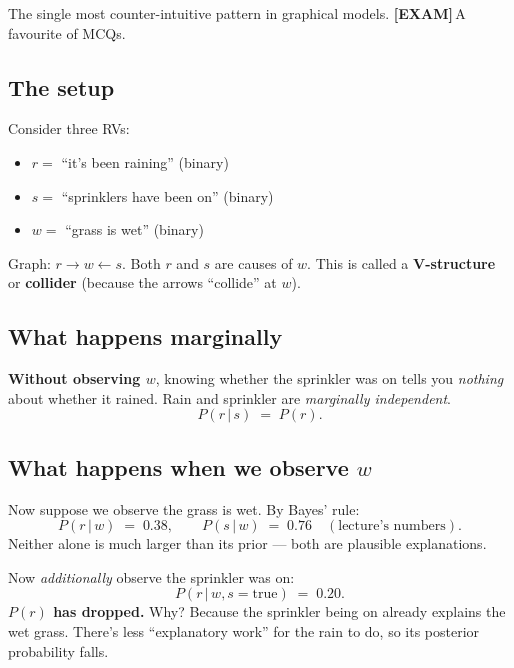 \documentclass[11pt, a4paper]{article}
\newcommand{\examflag}{\textcolor{tipBd}{\textbf{[EXAM]}}\,}
\begin{document}
The single most counter-intuitive pattern in graphical models. \examflag{}A favourite of MCQs.

\subsection{The setup}

Consider three RVs:
\begin{itemize}
  \item $r =$ ``it's been raining'' (binary)
  \item $s =$ ``sprinklers have been on'' (binary)
  \item $w =$ ``grass is wet'' (binary)
\end{itemize}

Graph: $r \to w \leftarrow s$. Both $r$ and $s$ are causes of $w$. This is called a \textbf{V-structure} or \textbf{collider} (because the arrows ``collide'' at $w$).

\subsection{What happens marginally}

\textbf{Without observing $w$}, knowing whether the sprinkler was on tells you \emph{nothing} about whether it rained. Rain and sprinkler are \emph{marginally independent}.
\[
P(r \,|\, s) \;=\; P(r).
\]

\subsection{What happens when we observe $w$}

Now suppose we observe the grass is wet. By Bayes' rule:
\[
P(r \,|\, w) \;=\; 0.38, \qquad P(s \,|\, w) \;=\; 0.76 \quad(\text{lecture's numbers}).
\]
Neither alone is much larger than its prior — both are plausible explanations.

Now \emph{additionally} observe the sprinkler was on:
\[
P(r \,|\, w, s = \text{true}) \;=\; 0.20.
\]
\textbf{$P(r)$ has dropped.} Why? Because the sprinkler being on already explains the wet grass. There's less ``explanatory work'' for the rain to do, so its posterior probability falls.
\end{document}
